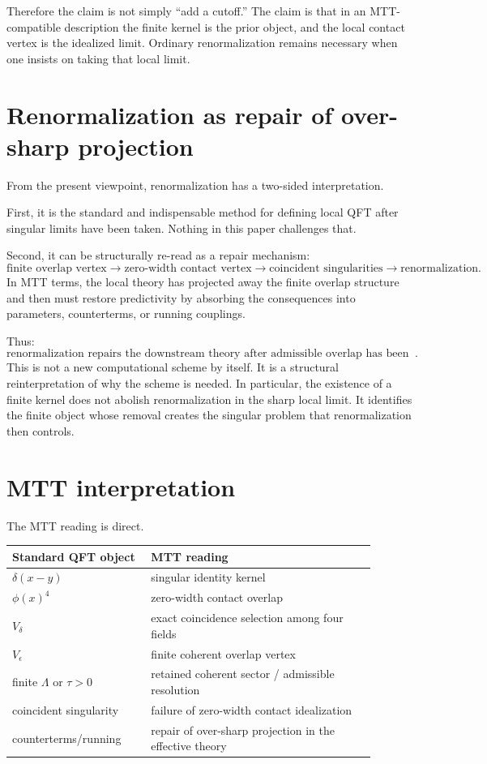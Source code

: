\documentclass[11pt]{article}
\begin{document}
Therefore the claim is not simply ``add a cutoff.''  The claim is that in an MTT-compatible
description the finite kernel is the prior object, and the local contact vertex is the idealized
limit.  Ordinary renormalization remains necessary when one insists on taking that local
limit.

\section{Renormalization as repair of over-sharp projection}

From the present viewpoint, renormalization has a two-sided interpretation.

First, it is the standard and indispensable method for defining local QFT after singular
limits have been taken.  Nothing in this paper challenges that.

Second, it can be structurally re-read as a repair mechanism:
\[
\text{finite overlap vertex}
\longrightarrow
\text{zero-width contact vertex}
\longrightarrow
\text{coincident singularities}
\longrightarrow
\text{renormalization}.
\]
In MTT terms, the local theory has projected away the finite overlap structure and then must
restore predictivity by absorbing the consequences into parameters, counterterms, or running
couplings.

Thus:
\[
\boxed{\text{renormalization repairs the downstream theory after admissible overlap has been idealized as point contact}.}
\]
This is not a new computational scheme by itself.  It is a structural reinterpretation of why
the scheme is needed.  In particular, the existence of a finite kernel does not abolish
renormalization in the sharp local limit.  It identifies the finite object whose removal creates
the singular problem that renormalization then controls.

\section{MTT interpretation}

The MTT reading is direct.

\begin{center}
\begin{tabular}{p{0.34\linewidth}p{0.55\linewidth}}
\hline
\textbf{Standard QFT object} & \textbf{MTT reading}\\
\hline
\(\delta(x-y)\) & singular identity kernel\\
\(\phi(x)^4\) & zero-width contact overlap\\
\(V_\delta\) & exact coincidence selection among four fields\\
\(V_\epsilon\) & finite coherent overlap vertex\\
finite \(\Lambda\) or \(\tau>0\) & retained coherent sector / admissible resolution\\
coincident singularity & failure of zero-width contact idealization\\
counterterms/running & repair of over-sharp projection in the effective theory\\
\hline
\end{tabular}
\end{center}
\end{document}
